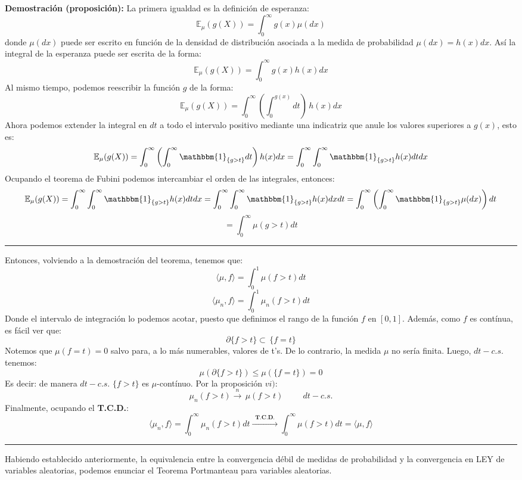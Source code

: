 \documentclass[a4paper]{article}
\numberwithin{equation}{subsection}
\def\E{\mathbb E}
\begin{document}
\textbf{Demostración (proposición):} La primera igualdad es la definición de esperanza:
\[\E_{\mu}(g(X)) = \int_{0}^{\infty}g(x)\mu(dx)\]
donde $\mu(dx)$ puede ser escrito en función de la densidad de distribución asociada a la medida de probabilidad $\mu(dx) = h(x)dx$. Así la integral de la esperanza puede ser escrita de la forma:
\[\E_{\mu}(g(X)) =\int_{0}^{\infty}g(x)h(x)dx\]
Al mismo tiempo, podemos reescribir la función $g$ de la forma:
\[\E_{\mu}(g(X)) = \int_{0}^{\infty}\left(\int_{0}^{g(x)}dt\right)\,h(x)dx\]
Ahora podemos extender la integral en $dt$ a todo el intervalo positivo mediante una indicatriz que anule los valores superiores a $g(x)$, esto es:
\[\E_{\mu}(g(X)) = \int_{0}^{\infty}\left(\int_{0}^{\infty}\mathbbm{1}_{\{g>t\}}dt\right)h(x)dx = \int_{0}^{\infty}\int_{0}^{\infty}\mathbbm{1}_{\{g>t\}}h(x)dtdx\]
Ocupando el teorema de Fubini podemos intercambiar el orden de las integrales, entonces:
\[\E_{\mu}(g(X)) = \int_{0}^{\infty}\int_{0}^{\infty}\mathbbm{1}_{\{g>t\}}h(x)dtdx = \int_{0}^{\infty}\int_{0}^{\infty}\mathbbm{1}_{\{g>t\}}h(x)dxdt = \int_{0}^{\infty}\left(\int_{0}^{\infty}\mathbbm{1}_{\{g>t\}}\mu(dx)\right)dt\]
\[ = \int_{0}^{\infty}\mu(g>t)dt\]
\rule{0.7em}{0.7em}

Entonces, volviendo a la demostración del teorema, tenemos que:
\[\langle \mu,f\rangle = \int_{0}^{1}\mu(f>t)dt\]
\[\langle \mu_n , f \rangle = \int_{0}^{1}\mu_n(f>t)dt\]
Donde el intervalo de integración lo podemos acotar, puesto que definimos el rango de la función $f$ en $[0,1]$. Además, como $f$ es contínua, es fácil ver que:
\[\partial \{f>t\} \subset\,\{f=t\}\]
Notemos que $\mu(f=t)=0$ salvo para, a lo más numerables, valores de t's. De lo contrario, la medida $\mu$ no sería finita. Luego, $dt-c.s.$ tenemos:
\[\mu(\partial\{f>t\}) \leq \mu(\{f=t\}) = 0\]
Es decir: de manera $dt-c.s.$ $\{f>t\}$ es $\mu$-contínuo. Por la proposición $vi)$:
\[\mu_n(f>t) \xrightarrow{\,\,n\,\,}\,\mu(f>t)\hspace{1cm}dt-c.s.\]
Finalmente, ocupando el \textbf{T.C.D.}:
\[\langle\mu_n,f\rangle = \int_{0}^{\infty}\mu_n(f>t)dt \xrightarrow{\,\,\,\textbf{T.C.D.}\,\,\,}\int_{0}^{\infty}\mu(f>t)dt = \langle \mu,f\rangle\]
\rule{0.7em}{0.7em}

Habiendo establecido anteriormente, la equivalencia entre la convergencia débil de medidas de probabilidad y la convergencia en LEY de variables aleatorias, podemos enunciar el Teorema Portmanteau para variables aleatorias.
\end{document}
